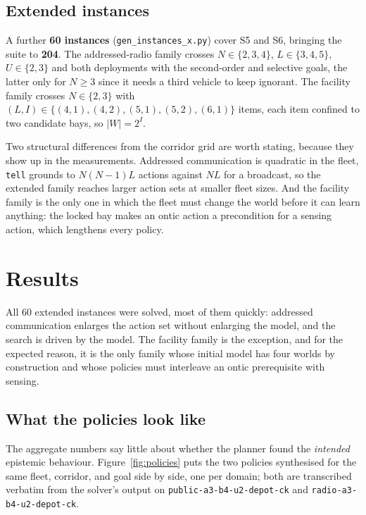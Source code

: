 \documentclass[11pt,a4paper]{article}
\theoremstyle{definition}
\begin{document}
\subsection{Extended instances}

A further \textbf{60 instances} (\texttt{gen\_instances\_x.py}) cover S5 and
S6, bringing the suite to \textbf{204}. The addressed-radio family crosses
$N\in\{2,3,4\}$, $L\in\{3,4,5\}$, $U\in\{2,3\}$ and both deployments with the
second-order and selective goals, the latter only for $N\ge3$ since it needs a
third vehicle to keep ignorant. The facility family crosses $N\in\{2,3\}$ with
$(L,I)\in\{(4,1),(4,2),(5,1),(5,2),(6,1)\}$ items, each item confined to two
candidate bays, so $|W| = 2^{I}$.

Two structural differences from the corridor grid are worth stating, because
they show up in the measurements. Addressed communication is quadratic in the
fleet, \texttt{tell} grounds to $N(N{-}1)L$ actions against $NL$ for a
broadcast, so the extended family reaches larger action sets at smaller
fleet sizes. And the facility family is the only one in which the fleet must
change the world before it can learn anything: the locked bay makes an ontic
action a precondition for a sensing action, which lengthens every policy.

\section{Results}
\label{sec:results}









All 60 extended instances were solved, most of them quickly: addressed
communication enlarges the action set without enlarging the model, and the
search is driven by the model. The facility family is the exception, and for
the expected reason, it is the only family whose initial model has four
worlds by construction and whose policies must interleave an ontic
prerequisite with sensing.

\subsection{What the policies look like}

The aggregate numbers say little about whether the planner found the
\emph{intended} epistemic behaviour. Figure~\ref{fig:policies} puts the two
policies synthesised for the same fleet, corridor, and goal side by side, one
per domain; both are transcribed verbatim from the solver's output on
\texttt{public-a3-b4-u2-depot-ck} and \texttt{radio-a3-b4-u2-depot-ck}.
\end{document}
